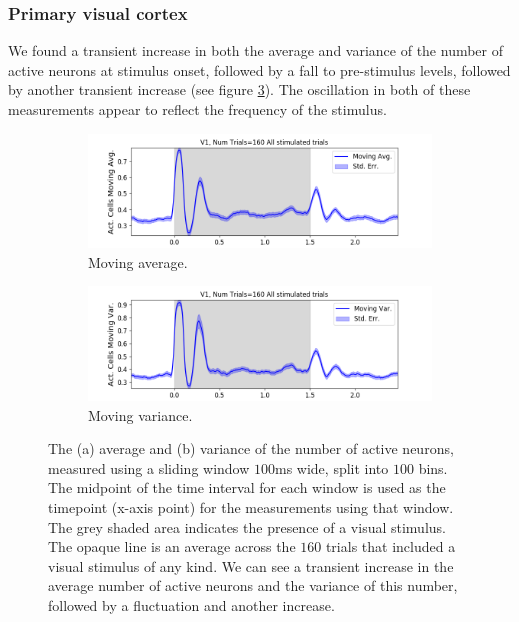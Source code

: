 \documentclass[a4paper,12pt]{article}
\theoremstyle{definition}
\begin{document}
    \subsubsection{Primary visual cortex}
    We found a transient increase in both the average and variance of the number of active neurons at stimulus onset, followed by a fall to pre-stimulus levels, followed by another transient increase (see figure \ref{fig:v1_moving_avg_and_var}). The oscillation in both of these measurements appear to reflect the frequency of the stimulus.

    \begin{figure}[h]
      \begin{subfigure}[h]{\linewidth}
        \includegraphics[width=\linewidth]{figures/v1_1ms_moving_avg_all_stimulated_trials.png}
        \caption{Moving average.}
        \label{fig:v1_moving_avg_num_active_cells}
      \end{subfigure}
      \begin{subfigure}[h]{\linewidth}
        \includegraphics[width=\linewidth]{figures/v1_1ms_moving_var_all_stimulated_trials.png}
        \caption{Moving variance.}
        \label{fig:v1_moving_var_num_active_cells}
      \end{subfigure}
      \caption{The (a) average and (b) variance of the number of active neurons, measured using a sliding window $100$ms wide, split into $100$ bins. The midpoint of the time interval for each window is used as the timepoint (x-axis point) for the measurements using that window. The grey shaded area indicates the presence of a visual stimulus. The opaque line is an average across the $160$ trials that included a visual stimulus of any kind. We can see a transient increase in the average number of active neurons and the variance of this number, followed by a fluctuation and another increase.}
      \label{fig:v1_moving_avg_and_var}
    \end{figure}
\end{document}
